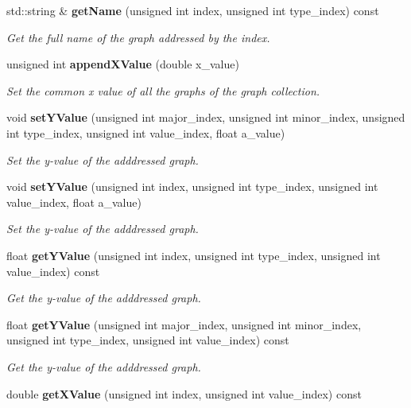 \begin{DoxyCompactItemize}
std\-::string \& {\bf get\-Name} (unsigned int index, unsigned int type\-\_\-index) const 
\begin{DoxyCompactList}\small\item\em Get the full name of the graph addressed by the index. \end{DoxyCompactList}\item 
unsigned int {\bf append\-X\-Value} (double x\-\_\-value)
\begin{DoxyCompactList}\small\item\em Set the common x value of all the graphs of the graph collection. \end{DoxyCompactList}\item 
void {\bf set\-Y\-Value} (unsigned int major\-\_\-index, unsigned int minor\-\_\-index, unsigned int type\-\_\-index, unsigned int value\-\_\-index, float a\-\_\-value)\label{classhistmgr_1_1GraphCollection__t_a2d86a21418a91537e8cb831673b4e88b}

\begin{DoxyCompactList}\small\item\em Set the y-\/value of the adddressed graph. \end{DoxyCompactList}\item 
void {\bf set\-Y\-Value} (unsigned int index, unsigned int type\-\_\-index, unsigned int value\-\_\-index, float a\-\_\-value)\label{classhistmgr_1_1GraphCollection__t_afa630f68afc52b4f115fe35e1c652119}

\begin{DoxyCompactList}\small\item\em Set the y-\/value of the adddressed graph. \end{DoxyCompactList}\item 
float {\bf get\-Y\-Value} (unsigned int index, unsigned int type\-\_\-index, unsigned int value\-\_\-index) const \label{classhistmgr_1_1GraphCollection__t_aa897bd01a3c31af0e8b82dbef6b57271}

\begin{DoxyCompactList}\small\item\em Get the y-\/value of the adddressed graph. \end{DoxyCompactList}\item 
float {\bf get\-Y\-Value} (unsigned int major\-\_\-index, unsigned int minor\-\_\-index, unsigned int type\-\_\-index, unsigned int value\-\_\-index) const \label{classhistmgr_1_1GraphCollection__t_a16f16887fc54666fca9fb47c8d45a6d0}

\begin{DoxyCompactList}\small\item\em Get the y-\/value of the adddressed graph. \end{DoxyCompactList}\item 
double {\bf get\-X\-Value} (unsigned int index, unsigned int value\-\_\-index) const \label{classhistmgr_1_1GraphCollection__t_a7dd9e9ac73e5e5ba7bf9f2786a73af0b}


\end{DoxyCompactItemize}
